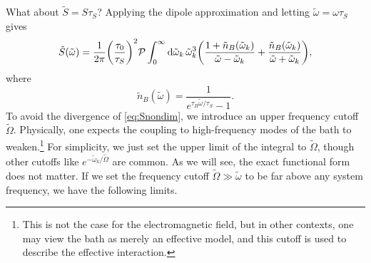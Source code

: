 \documentclass[../thesis.tex]{subfiles}
\begin{document}
What about $\tilde{S} = S\tau_S$? Applying the dipole approximation and letting
$\tilde{\omega} = \omega\tau_S$ gives 
\begin{equation}
  \tilde{S}(\tilde{\omega})
  = \frac{1}{2\pi} {\qty(\frac{\tau_0}{\tau_S})}^2
  \pv\int_0^\infty \dd{\tilde{\omega}_k} \tilde{\omega}_k^3
  \qty(\frac{1 + \tilde{n}_B(\tilde{\omega}_k)}{\tilde{\omega} - \tilde{\omega}_k}
  + \frac{\tilde{n}_B(\tilde{\omega}_k)}{\tilde{\omega} + \tilde{\omega}_k}),
  \label{eq:Snondim}
\end{equation}
where
\begin{equation}
  \tilde{n}_B(\tilde{\omega})
  = \frac{1}{e^{\tau_B \tilde{\omega} / \tau_S} - 1}.
\end{equation}
To avoid the divergence of \cref{eq:Snondim}, we introduce an upper frequency
cutoff $\tilde{\Omega}$. Physically, one expects the coupling to high-frequency
modes of the bath to weaken.\footnote{%
  This is not the case for the electromagnetic field, but in other contexts, one
  may view the bath as merely an effective model, and this cutoff is used to
  describe the effective interaction.
}
For simplicity, we just set the upper limit of the
integral to $\tilde{\Omega}$, though other cutoffs like $e^{-\tilde{\omega}_k /
\tilde{\Omega}}$ are common. As we will see, the exact functional form does not
matter. If we set the frequency cutoff $\tilde{\Omega} \gg \tilde{\omega}$ to be
far above any system frequency, we have the following limits.
\end{document}
